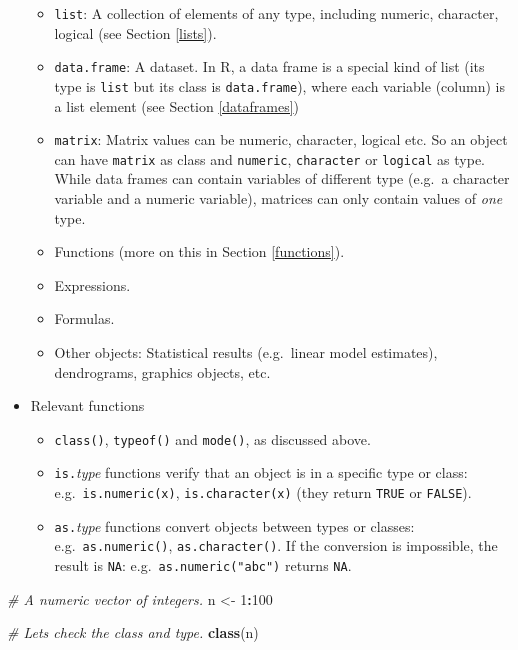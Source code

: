 \documentclass[
]{book}
\newenvironment{Shaded}{\begin{snugshade}}{\end{snugshade}}
\newcommand{\CommentTok}[1]{\textcolor[rgb]{0.56,0.35,0.01}{\textit{#1}}}
\newcommand{\DecValTok}[1]{\textcolor[rgb]{0.00,0.00,0.81}{#1}}
\newcommand{\FunctionTok}[1]{\textcolor[rgb]{0.13,0.29,0.53}{\textbf{#1}}}
\newcommand{\NormalTok}[1]{#1}
\newcommand{\OtherTok}[1]{\textcolor[rgb]{0.56,0.35,0.01}{#1}}
\newcommand{\SpecialCharTok}[1]{\textcolor[rgb]{0.81,0.36,0.00}{\textbf{#1}}}
\providecommand{\tightlist}{%
  \setlength{\itemsep}{0pt}\setlength{\parskip}{0pt}}
\begin{document}
\begin{itemize}
  \begin{itemize}
  \tightlist
  \item
    \texttt{list}: A collection of elements of any type, including numeric, character, logical (see Section \ref{lists}).
  \item
    \texttt{data.frame}: A dataset. In R, a data frame is a special kind of list (its type is \texttt{list} but its class is \texttt{data.frame}), where each variable (column) is a list element (see Section \ref{dataframes})
  \item
    \texttt{matrix}: Matrix values can be numeric, character, logical etc. So an object can have \texttt{matrix} as class and \texttt{numeric}, \texttt{character} or \texttt{logical} as type. While data frames can contain variables of different type (e.g.~a character variable and a numeric variable), matrices can only contain values of \emph{one} type.
  \item
    Functions (more on this in Section \ref{functions}).
  \item
    Expressions.
  \item
    Formulas.
  \item
    Other objects: Statistical results (e.g.~linear model estimates), dendrograms, graphics objects, etc.
  \end{itemize}
\item
  Relevant functions

  \begin{itemize}
  \tightlist
  \item
    \texttt{class()}, \texttt{typeof()} and \texttt{mode()}, as discussed above.
  \item
    \texttt{is.}\emph{type} functions verify that an object is in a specific type or class: e.g.~\texttt{is.numeric(x)}, \texttt{is.character(x)} (they return \texttt{TRUE} or \texttt{FALSE}).
  \item
    \texttt{as.}\emph{type} functions convert objects between types or classes: e.g.~\texttt{as.numeric()}, \texttt{as.character()}. If the conversion is impossible, the result is \texttt{NA}: e.g.~\texttt{as.numeric("abc")} returns \texttt{NA}.
  \end{itemize}
\end{itemize}

\begin{Shaded}
\begin{Highlighting}[]
\CommentTok{\# A numeric vector of integers.}
\NormalTok{n }\OtherTok{\textless{}{-}} \DecValTok{1}\SpecialCharTok{:}\DecValTok{100}

\CommentTok{\# Let\textquotesingle{}s check the class and type.}
\FunctionTok{class}\NormalTok{(n)}
\end{Highlighting}
\end{Shaded}
\end{document}
